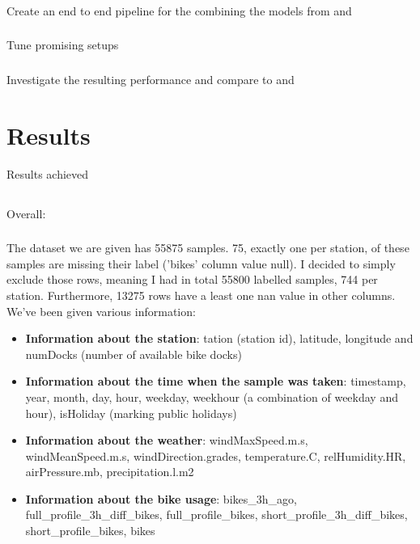 \documentclass[a4paper]{article}
\begin{document}
    \subsubsection*{} Create an end to end pipeline for the combining the models from  and 
    \subsubsection*{} Tune promising setups
    \subsubsection*{} Investigate the resulting performance and compare to  and 



    \section{Results}\label{sec:results}
    Results achieved

    \subsection*{}
    Overall:

    \subsubsection*{}
    The dataset we are given has 55875 samples. 75, exactly one per station, of these samples are missing their label ('bikes'
    column value null).
    I decided to simply exclude those rows, meaning I had in total 55800 labelled samples, 744 per station. Furthermore,
    13275 rows have a least one nan value in other columns.
    We've been given various information:
    \begin{itemize}
        \item \textbf{Information about the station}: tation (station id), latitude, longitude and
        numDocks (number of available bike docks)
        \item \textbf{Information about the time when the sample was taken}: timestamp, year, month, day, hour,
        weekday, weekhour (a combination of weekday and hour), isHoliday (marking public holidays)
        \item \textbf{Information about the weather}: windMaxSpeed.m.s, windMeanSpeed.m.s,  windDirection.grades,
        temperature.C, relHumidity.HR, airPressure.mb, precipitation.l.m2
        \item \textbf{Information about the bike usage}: bikes\_3h\_ago, full\_profile\_3h\_diff\_bikes,
        full\_profile\_bikes, short\_profile\_3h\_diff\_bikes, short\_profile\_bikes, bikes
    \end{itemize}
\end{document}
